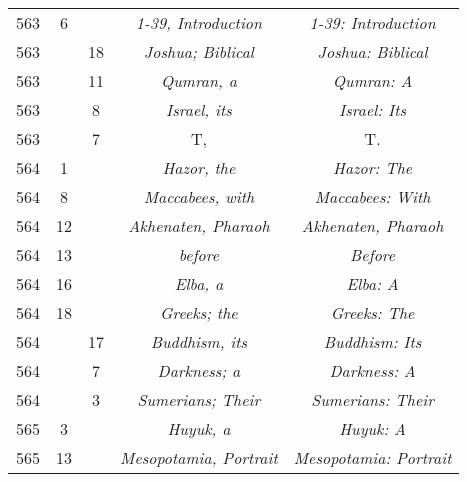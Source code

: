 \documentclass[a4paper,11pt]{article}
\begin{document}
\begin{center}
\begin{tabular}{|c|c|c|c|c|}
    563 &  6 & & \emph{1-39, Introduction} & \emph{1-39: Introduction} \\
    563 & & 18 & \emph{Joshua; Biblical} & \emph{Joshua: Biblical} \\
    563 & & 11 & \emph{Qumran, a} & \emph{Qumran: A} \\
    563 & &  8 & \emph{Israel, its} & \emph{Israel: Its} \\
    563 & &  7 & T, & T. \\
    564 &  1 & & \emph{Hazor, the} & \emph{Hazor: The} \\
    564 &  8 & & \emph{Maccabees, with} & \emph{Maccabees: With} \\
    564 & 12 & & \emph{Akhenaten, Pharaoh} & \emph{Akhenaten, Pharaoh} \\
    564 & 13 & & \emph{before} & \emph{Before} \\
    564 & 16 & & \emph{Elba, a} & \emph{Elba: A} \\
    564 & 18 & & \emph{Greeks; the} & \emph{Greeks: The} \\
    564 & & 17 & \emph{Buddhism, its} & \emph{Buddhism: Its} \\
    564 & &  7 & \emph{Darkness; a} & \emph{Darkness: A} \\
    564 & &  3 & \emph{Sumerians; Their} & \emph{Sumerians: Their} \\
    565 &  3 & & \emph{Huyuk, a} & \emph{Huyuk: A} \\
    565 & 13 & & \emph{Mesopotamia, Portrait}
           & \emph{Mesopotamia: Portrait} \\
    \hline
  \end{tabular}



\end{center}
\end{document}
